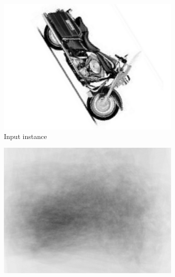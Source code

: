 
\begin{figure}[ht]
\centering
\begin{subfigure}[b]{0.28\linewidth} \centering 
	\includegraphics[width=\linewidth]{fig/3dreg/onebike_before2.png}
	\caption{Input instance}
	\label{fig:concept1}
\end{subfigure}
\begin{subfigure}[b]{0.28\linewidth} \centering 
	\includegraphics[width=\linewidth]{fig/3dreg/avgbike_before.png}

\end{subfigure}
\end{figure}
